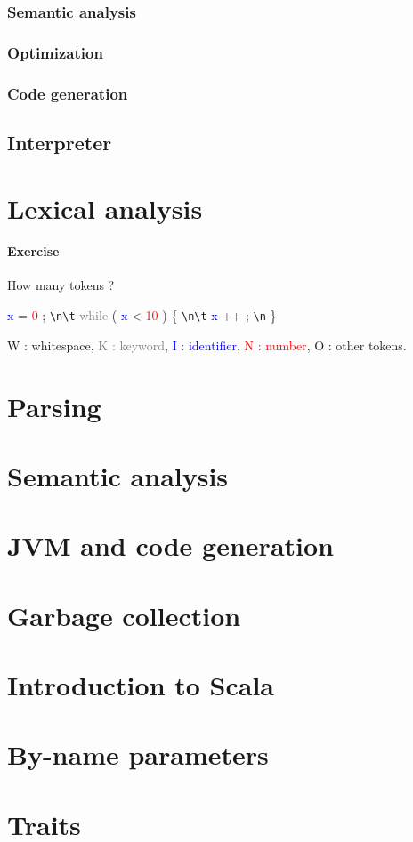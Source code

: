 \documentclass[12pt, a4paper]{article}
\begin{document}
    \subsubsection{Semantic analysis}
    \subsubsection{Optimization}
    \subsubsection{Code generation}
    \subsection{Interpreter}

  \section{Lexical analysis}
  \paragraph{Exercise}
  How many tokens ?
  \begin{center}
      \textcolor{blue}{x}
      \textcolor{green!60!black}{=}
      \textcolor{red}{0}
      \textcolor{green!60!black}{;}
      \verb#\n\t#
      \textcolor{gray}{while}
      \textcolor{green!60!black}{(}
      \textcolor{blue}{x}
      \textcolor{green!60!black}{<}
      \textcolor{red}{10}
      \textcolor{green!60!black}{)}
      \textcolor{green!60!black}{\{}
      \verb#\n\t#
      \textcolor{blue}{x}
      \textcolor{green!60!black}{++}
      \textcolor{green!60!black}{;}
      \verb#\n#
      \textcolor{green!60!black}{\}}
  \end{center}
  W : whitespace,
  \textcolor{gray}{K : keyword},
  \textcolor{blue}{I : identifier},
  \textcolor{red}{N : number},
  \textcolor{green!60!black}{O : other tokens}.
  \section{Parsing}
  \section{Semantic analysis}
  \section{JVM and code generation}
  \section{Garbage collection}
  \section{Introduction to Scala}
  \section{By-name parameters}
  \section{Traits}
\end{document}
